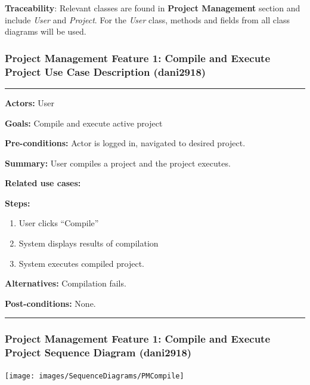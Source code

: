 \documentclass[twoside,letterpaper]{article}
\begin{document}
\noindent \textbf{Traceability}:
Relevant classes are found in \textbf{Project Management} section and include \textit{User} and \textit{Project}. For the \textit{User} class, methods and fields from all class diagrams will be used.

\subsubsection[Project Management Feature 1: Use Case Description 1: Compile and execute project (dani2918)]{\rmfamily\bfseries\color{black}
	Project Management Feature 1: Compile and Execute Project Use Case Description (dani2918) }
\hypertarget{RefHeading22059017292}{}
\bigskip
\vspace{2pt}
\hrule
\vspace{8pt}
 \textbf{Actors:} User \newline
 
\noindent \textbf{Goals:} Compile and execute active project\newline

 \noindent \textbf{Pre-conditions:} Actor is logged in, navigated to desired project.  \newline
 
\noindent \textbf{Summary:} User compiles a project and the project executes.\newline

\noindent \textbf{Related use cases:} \newline

\noindent \textbf{Steps:} \begin{enumerate}
  \item User clicks ``Compile''
  \item System displays results of compilation
  \item System executes compiled project.
 \end{enumerate}
 \noindent \textbf{Alternatives:} Compilation fails. \newline
 
\noindent  \textbf{Post-conditions:} None. \newline
 
\vspace{8pt}
\hrule
\vspace{20pt}
\newpage
\subsubsection[Project Management Feature 1: Sequence Diagram 1: Compile and execute project (dani2918)]{\rmfamily\bfseries\color{black}
	Project Management Feature 1: Compile and Execute Project Sequence Diagram (dani2918) }
\texttt{[image: images/SequenceDiagrams/PMCompile]}
\end{document}

